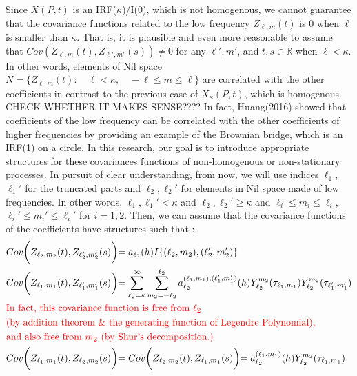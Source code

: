 \documentclass[11pt]{article}
\begin{document}
\begin{itemize}
{\begin{align*}
\end{align*}
}
\\
Since $X(P,t)$ is an IRF($\kappa$)/I(0), which is not homogenous, we cannot guarantee that the covariance functions related to the low frequency $Z_{\ell, m}(t)$ is 0 when $\ell$ is smaller than $\kappa$. That is, it is plausible and even more reasonable to assume that $Cov(Z_{\ell,m}(t), Z_{\ell',m'}(s)) \ne 0$ for any $\ell', m'$, and $t,s \in \mathbb{R}$ when $\ell<\kappa$. In other words, elements of Nil space $N=\{Z_{\ell,m}(t) : \quad \ell<\kappa, \quad -\ell \le m \le \ell\}$ are correlated with the other coefficients in contrast to the previous case of $X_\kappa(P,t)$, which is homogenous.{\color{red} CHECK WHETHER IT MAKES SENSE????} In fact, Huang(2016) showed that coefficients of the low frequency can be correlated with the other coefficients of higher frequencies by providing an example of the Brownian bridge, which is an IRF(1) on a circle. In this research, our goal is to introduce appropriate structures for these covariances functions of non-homogenous or non-stationary processes. In pursuit of clear understanding, from now, we will use indices $\ell_1$, $\ell_1'$ for the truncated parts and $\ell_2,\ell_2'$ for elements in Nil space made of low frequencies. In other words, $\ell_1, \ell_1' < \kappa$ and $\ell_2, \ell _2' \ge \kappa$ and $\ell_i \le m_i \le \ell_i$, $\ell_i' \le m_i' \le \ell_i'$ for $i=1,2$. Then, we can assume that the covariance functions of the coefficients have structures such that :\\
\begin{align*}
&Cov\biggl( Z_{\ell_2,m_2}(t), Z_{\ell_2',m_2'}(s) \biggl) = a_{\ell_2}(h) I\{(\ell_2,m_2),(\ell'_2,m_2')\}\\
&Cov\biggl( Z_{\ell_1,m_1}(t), Z_{\ell_1',m_1'}(s) \biggl) = \sum_{\ell_2=\kappa}^{\infty} \sum_{m_2=-\ell_2}^{\ell_2} a_{\ell_2}^{(\ell_1,m_1), (\ell_1',m_1')} (h) Y_{\ell_2}^{m_2}(\tau_{\ell_1,m_1}) Y_{\ell_2}^{m_2}(\tau_{\ell_1',m_1'})\\
&\text{\color{red} In fact, this covariance function is free from $\ell_2$}\\
&\text{\color{red} (by addition theorem \& the generating function of Legendre Polynomial), }\\
&\text{\color{red} and also free from $m_2$ (by Shur's decomposition.)}\\
&Cov\biggl( Z_{\ell_1,m_1}(t), Z_{\ell_2,m_2}(s) \biggl) = Cov\biggl( Z_{\ell_2,m_2}(t), Z_{\ell_1,m_1}(s) \biggl) = a_{\ell_2}^{(\ell_1, m_1)}(h) Y_{\ell_2}^{m_2}(\tau_{\ell_1,m_1})\\

\end{align*}
\end{itemize}
\end{document}
